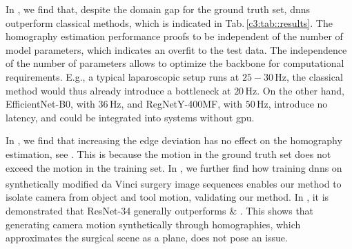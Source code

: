 In , we find that, despite the domain gap for the ground truth set, \gls{dnn}s outperform classical methods, which is indicated in Tab.\,\ref{c3:tab::results}. The homography estimation performance proofs to be independent of the number of model parameters, which indicates an overfit to the test data. The independence of the number of parameters allows to optimize the backbone for computational requirements. E.g., a typical laparoscopic setup runs at $25-30\,\text{Hz}$, the classical method would thus already introduce a bottleneck at $20\,\text{Hz}$. On the other hand, EfficientNet-B0, with $36\,\text{Hz}$, and RegNetY-400MF, with $50\,\text{Hz}$, introduce no latency, and could be integrated into systems without \gls{gpu}.


In , we find that increasing the edge deviation has no effect on the homography estimation, see . This is because the motion in the ground truth set does not exceed the motion in the training set. In , we further find how training \gls{dnn}s on synthetically modified da Vinci\textsuperscript{\textregistered} surgery image sequences enables our method to isolate camera from object and tool motion, validating our method. In , it is demonstrated that ResNet-34 generally outperforms  \& . This shows that generating camera motion synthetically through homographies, which approximates the surgical scene as a plane, does not pose an issue.

